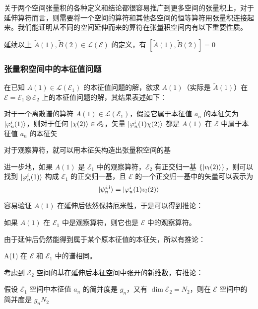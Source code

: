 \documentclass[cn,10pt,math=newtx,citestyle=gb7714-2015,bibstyle=gb7714-2015]{elegantbook}
\def\ms{\mathscr}
\def\mc{\mathcal}
\def\vphi{\varphi}
\def\ox{\otimes}
\def\td{\tilde}
\begin{document}
关于两个空间张量积的各种定义和结论都很容易推广到更多空间的张量积上，对于延伸算符而言，则需要将一个空间的算符和其他各空间的恒等算符用张量积连接起来。我们能证明从不同的空间延伸而来的算符在张量积空间内有以下重要性质。
\begin{theorem}[延伸算符的对易性]\label{thm:extnd_oprtr_cmmtble}
   延续以上 $\td A(1),\td B(2)\in\mc L(\ms E)$ 的定义，有 $[\td A(1),\td B(2)]=0$
\end{theorem}

\subsubsection{张量积空间中的本征值问题}

在已知 $A(1)\in\mc L(\ms E_1)$ 的本征值问题的解，欲求 $A(1)$（实际是 $\td A(1)$）在 $\ms E = \ms E_1\ox \ms E_2$ 上的本征值问题的解，其结果表述如下：

\begin{lemma}[延伸算符的本征值问题]
   对于一个离散谱的算符 $A(1)\in\mc L(\ms E_1)$，假设它属于本征值 $a_n$ 的本征矢为 $\ket{\vphi_n^i(1)}$，则对于任何 $\ket{\chi(2)}\in\ms E_2$，矢量 $\ket{\vphi_n^i(1)\chi(2)}$ 都是 $A(1)$ 在 $\ms E$ 中属于本征值 $a_n$ 的本征矢 
\end{lemma}

对于观察算符，就可以用本征矢构造出张量积空间的基

\begin{theorem}[延伸观察算符的本征系统]
   进一步地，如果 $A(1)$ 是 $\ms E_1$ 中的观察算符，$\ms E_2$ 有正交归一基 $\{\ket{v_l(2)}\}$，则可以找到 $\ket{\vphi_n^i(1)}$ 构成 $\ms E_1$ 的正交归一基，且 $\ms E$ 的一个正交归一基中的矢量可以表示为
   \begin{equation}
       \ket{\psi_n^{i,l}} = \ket{\vphi_n^i(1)v_l(2)}
   \end{equation}
\end{theorem}

容易验证 $A(1)$ 在延伸后依然保持厄米性，于是可以得到推论：
\begin{corollary}[延伸后保持观察算符的性质]
    如果 $A(1)$ 在 $\ms E_1$ 中是观察算符，则它也是 $\ms E$ 中的观察算符。
\end{corollary}

由于延伸后仍然能得到属于某个原本征值的本征矢，所以有推论：
\begin{corollary}[延伸后保持原有的谱]
    A(1) 在 $\ms E$ 和 $\ms E_1$ 中的谱相同。
\end{corollary}

考虑到 $\ms E_2$ 空间的基在延伸后本征空间中张开的新维数，有推论：
\begin{corollary}[延伸后本征值简并度的扩张]\label{col:extnd_oprtr_dgnrcy}
    假设 $\ms E_1$ 空间中本征值 $a_n$ 的简并度是 $g_n$，又有 $\dim \ms E_2 = N_2$，则在 $\ms E$ 空间中的简并度是 $g_n N_2$
\end{corollary}
\end{document}
